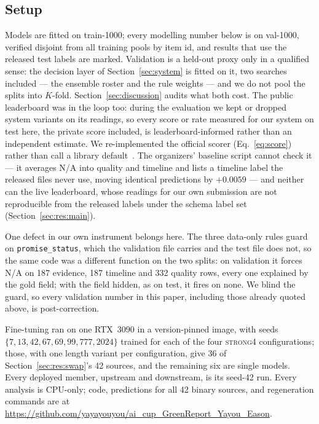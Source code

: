 \subsection{Setup}
\label{sec:setup}

Models are fitted on train-1000; every modelling number below is on val-1000, verified disjoint
from all training pools by item id, and results that use the released test labels are marked.
Validation is a held-out proxy only in a qualified sense: the decision layer of
Section~\ref{sec:system} is fitted on it, two searches included --- the ensemble roster and the
rule weights --- and we do not pool the splits into $K$-fold. Section~\ref{sec:discussion} audits
what both cost. The public leaderboard was in the loop too: during the evaluation we kept or
dropped system variants on its readings, so every score or rate measured for our system on test here,
the private score included, is leaderboard-informed rather than an independent estimate. We re-implemented the official scorer
(Eq.~\eqref{eq:score}) rather than call a library default~\cite{opitz2019macro}. The organizers'
baseline script cannot check it --- it averages N/A into quality and timeline and lists a
timeline label the released files never use, moving identical predictions by $+0.0059$ --- and
neither can the live leaderboard, whose readings for our own submission are not
reproducible from the released labels under the schema label set (Section~\ref{sec:res:main}).

One defect in our own instrument belongs here. The three data-only rules guard on
\texttt{promise\_status}, which the validation file carries and the test file does not, so the
same code was a different function on the two splits: on validation it forces N/A on 187
evidence, 187 timeline and 332 quality rows, every one explained by the gold field; with the
field hidden, as on test, it fires on none. We blind the guard, so every validation number in this
paper, including those already quoted above, is post-correction.

Fine-tuning ran on one RTX~3090 in a version-pinned image, with seeds
$\{7,13,42,67,69,99,777,2024\}$ trained for each of the four \textsc{strong4} configurations;
those, with one length variant per configuration, give 36 of Section~\ref{sec:res:swap}'s 42 sources, and
the remaining six are single models. Every deployed member, upstream and downstream, is its
seed-42 run. Every analysis is CPU-only; code, predictions for all 42 binary sources, and
regeneration commands are at
\url{https://github.com/yayayouyou/ai_cup_GreenReport_Yayou_Eason}.
